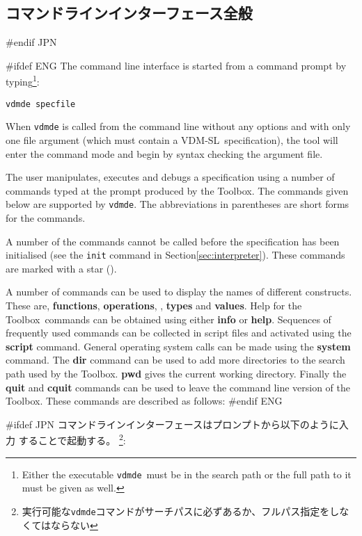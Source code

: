 \documentclass[\pformat,12pt]{article}
\newcommand{\vdmslpp}{VDM-SL}
\newcommand{\Toolbox}{Toolbox}
\newcommand{\vdmde}{vdmde}
\newcommand{\vdmslpp}{VDM++}
\newcommand{\Toolbox}{Toolbox}
\newcommand{\vdmde}{vppde}
\newcommand{\cmd}{\tt }
\begin{document}
\subsection{コマンドラインインターフェース全般}\label{subsec:maincommand}
#endif JPN

#ifdef ENG
The command line interface is started from a command prompt by
typing\footnote{Either the executable {\tt \vdmde}\ must be in the
  search path or the full path to it must be given as well.}:

{\tt \vdmde\ specfile}

When {\tt \vdmde} is called from the command line without any options
and with only one file argument (which must contain a \vdmslpp\ 
specification), the tool will enter the command mode and begin by
syntax checking the argument file.

The user manipulates, executes and debugs a specification using a
number of commands typed at the prompt produced by the \Toolbox.  The
commands given below are supported by {\tt \vdmde}.  The abbreviations
in parentheses are short forms for the commands.

A number of the commands cannot be called before the specification has
been initialised (see the {\cmd init} command in
Section\ref{sec:interpreter}).  These commands are marked with a star
({\tt *}).

A number of commands can be used to display the names of different
constructs. These are,
\textbf{functions}, \textbf{operations},
,
\textbf{types} and \textbf{values}.  Help for the \Toolbox\ commands
can be obtained using either \textbf{info} or \textbf{help}. Sequences
of frequently used commands can be collected in script files and
activated using the \textbf{script} command. General operating system
calls can be made using the \textbf{system} command. The \textbf{dir}
command can be used to add more directories to the search path used by
the \Toolbox. \textbf{pwd} gives the current
working directory. Finally the \textbf{quit} and \textbf{cquit}
commands can be used to leave the command line version of the
\Toolbox.  These commands are described as follows:
#endif ENG

#ifdef JPN
コマンドラインインターフェースはプロンプトから以下のように入力 することで起動する。
\footnote{実行可能な{\tt \vdmde}コマンドがサーチパスに必ずあるか、フルパス指定をしなくてはならない}:
\end{document}
